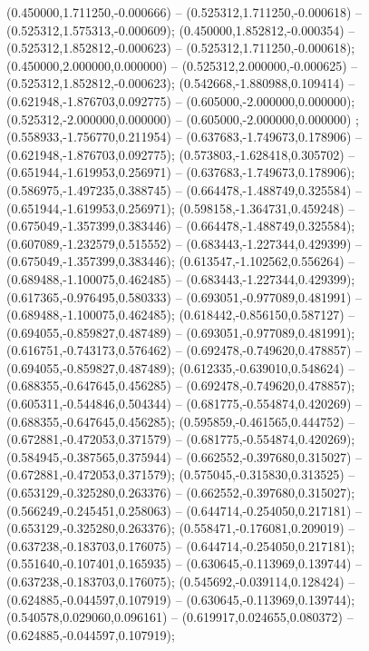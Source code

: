  (0.450000,1.711250,-0.000666) -- (0.525312,1.711250,-0.000618) -- (0.525312,1.575313,-0.000609);
 (0.450000,1.852812,-0.000354) -- (0.525312,1.852812,-0.000623) -- (0.525312,1.711250,-0.000618);
 (0.450000,2.000000,0.000000) -- (0.525312,2.000000,-0.000625) -- (0.525312,1.852812,-0.000623);
 (0.542668,-1.880988,0.109414) -- (0.621948,-1.876703,0.092775) -- (0.605000,-2.000000,0.000000);
 (0.525312,-2.000000,0.000000) -- (0.605000,-2.000000,0.000000) ;
 (0.558933,-1.756770,0.211954) -- (0.637683,-1.749673,0.178906) -- (0.621948,-1.876703,0.092775);
 (0.573803,-1.628418,0.305702) -- (0.651944,-1.619953,0.256971) -- (0.637683,-1.749673,0.178906);
 (0.586975,-1.497235,0.388745) -- (0.664478,-1.488749,0.325584) -- (0.651944,-1.619953,0.256971);
 (0.598158,-1.364731,0.459248) -- (0.675049,-1.357399,0.383446) -- (0.664478,-1.488749,0.325584);
 (0.607089,-1.232579,0.515552) -- (0.683443,-1.227344,0.429399) -- (0.675049,-1.357399,0.383446);
 (0.613547,-1.102562,0.556264) -- (0.689488,-1.100075,0.462485) -- (0.683443,-1.227344,0.429399);
 (0.617365,-0.976495,0.580333) -- (0.693051,-0.977089,0.481991) -- (0.689488,-1.100075,0.462485);
 (0.618442,-0.856150,0.587127) -- (0.694055,-0.859827,0.487489) -- (0.693051,-0.977089,0.481991);
 (0.616751,-0.743173,0.576462) -- (0.692478,-0.749620,0.478857) -- (0.694055,-0.859827,0.487489);
 (0.612335,-0.639010,0.548624) -- (0.688355,-0.647645,0.456285) -- (0.692478,-0.749620,0.478857);
 (0.605311,-0.544846,0.504344) -- (0.681775,-0.554874,0.420269) -- (0.688355,-0.647645,0.456285);
 (0.595859,-0.461565,0.444752) -- (0.672881,-0.472053,0.371579) -- (0.681775,-0.554874,0.420269);
 (0.584945,-0.387565,0.375944) -- (0.662552,-0.397680,0.315027) -- (0.672881,-0.472053,0.371579);
 (0.575045,-0.315830,0.313525) -- (0.653129,-0.325280,0.263376) -- (0.662552,-0.397680,0.315027);
 (0.566249,-0.245451,0.258063) -- (0.644714,-0.254050,0.217181) -- (0.653129,-0.325280,0.263376);
 (0.558471,-0.176081,0.209019) -- (0.637238,-0.183703,0.176075) -- (0.644714,-0.254050,0.217181);
 (0.551640,-0.107401,0.165935) -- (0.630645,-0.113969,0.139744) -- (0.637238,-0.183703,0.176075);
 (0.545692,-0.039114,0.128424) -- (0.624885,-0.044597,0.107919) -- (0.630645,-0.113969,0.139744);
 (0.540578,0.029060,0.096161) -- (0.619917,0.024655,0.080372) -- (0.624885,-0.044597,0.107919);
